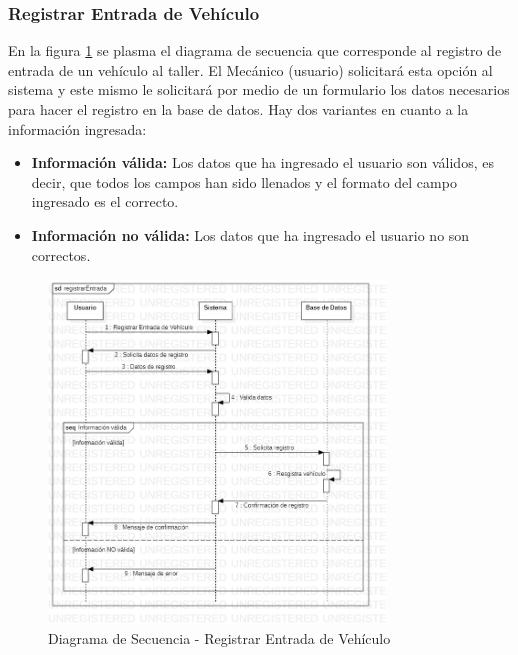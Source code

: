 \subsubsection{Registrar Entrada de Vehículo}
En la figura \ref{fig:Diagrama de Secuencia - Registrar Entrada de Vehículo} se plasma el diagrama de secuencia que corresponde al registro de entrada de un vehículo al taller. El Mecánico (usuario) solicitará esta opción al sistema y este mismo le solicitará por medio de un formulario los datos necesarios para hacer el registro en la base de datos. Hay dos variantes en cuanto a la información ingresada: 
\begin{itemize}
	\item \textbf{Información válida:} Los datos que ha ingresado el usuario son válidos, es decir, que todos los campos han sido llenados y el formato del campo ingresado es el correcto. 
	\item \textbf{Información no válida:} Los datos que ha ingresado el usuario no son correctos. 
\end{itemize}
\begin{figure}[!h]
	\centering
	\includegraphics[width=0.8\textwidth]{./diseno/vprocesos/imagenes/registrarEntrada}
	\caption{Diagrama de Secuencia - Registrar Entrada de Vehículo}
	\label{fig:Diagrama de Secuencia - Registrar Entrada de Vehículo}
\end{figure}